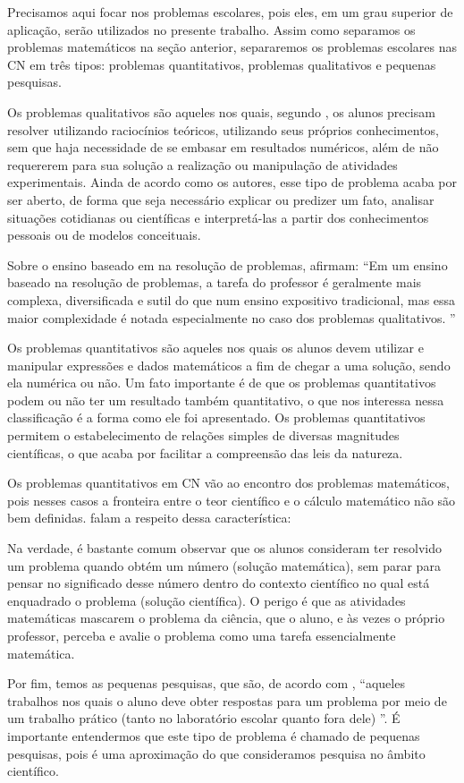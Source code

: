Precisamos aqui focar nos problemas escolares, pois eles, em um grau superior de aplicação, serão utilizados no presente trabalho. Assim como separamos os problemas matemáticos na seção anterior, separaremos os problemas escolares nas CN em três tipos: problemas quantitativos, problemas qualitativos e pequenas pesquisas. 

Os problemas qualitativos são aqueles nos quais, segundo , os alunos precisam resolver utilizando raciocínios teóricos, utilizando seus próprios conhecimentos, sem que haja necessidade de se embasar em resultados numéricos, além de não requererem para sua solução a realização ou manipulação de atividades experimentais. Ainda de acordo como os autores, esse tipo de problema acaba por ser aberto, de forma que seja necessário explicar ou predizer um fato, analisar situações cotidianas ou científicas e interpretá-las a partir dos conhecimentos pessoais ou de modelos conceituais. 

Sobre o ensino baseado em na resolução de problemas,  afirmam: “Em um ensino baseado na resolução de problemas, a tarefa do professor é geralmente mais complexa, diversificada e sutil do que num ensino expositivo tradicional, mas essa maior complexidade é notada especialmente no caso dos problemas qualitativos. ” 

Os problemas quantitativos são aqueles nos quais os alunos devem utilizar e manipular expressões e dados matemáticos a fim de chegar a uma solução, sendo ela numérica ou não. Um fato importante é de que os problemas quantitativos podem ou não ter um resultado também quantitativo, o que nos interessa nessa classificação é a forma como ele foi apresentado. Os problemas quantitativos permitem o estabelecimento de relações simples de diversas magnitudes científicas, o que acaba por facilitar a compreensão das leis da natureza. 

Os problemas quantitativos em CN vão ao encontro dos problemas matemáticos, pois nesses casos a fronteira entre o teor científico e o cálculo matemático não são bem definidas.  falam a respeito dessa característica: 

\begin{quoting}[leftmargin=4cm, rightmargin=0cm]
\noindent
Na verdade, é bastante comum observar que os alunos consideram ter resolvido um problema quando obtém um número (solução matemática), sem parar para pensar no significado desse número dentro do contexto científico no qual está enquadrado o problema (solução científica). O perigo é que as atividades matemáticas mascarem o problema da ciência, que o aluno, e às vezes o próprio professor, perceba e avalie o problema como uma tarefa essencialmente matemática. 
\end{quoting}

Por fim, temos as pequenas pesquisas, que são, de acordo com , “aqueles trabalhos nos quais o aluno deve obter respostas para um problema por meio de um trabalho prático (tanto no laboratório escolar quanto fora dele) ”.  É importante entendermos que este tipo de problema é chamado de pequenas pesquisas, pois é uma aproximação do que consideramos pesquisa no âmbito científico. 
